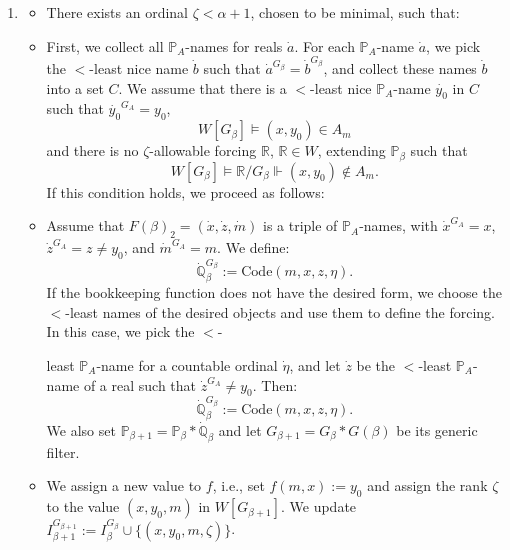 \documentclass[a4paper,11pt]{article}
\newcommand{\forceP}{\mathbb{P}}
\newcommand{\forceQ}{\mathbb{Q}}
\newcommand{\forceR}{\mathbb{R}}
\begin{document}
\begin{enumerate}
\item[(a)]  
  \begin{itemize}
  \item[] There exists an ordinal \( \zeta < \alpha+1 \), chosen to be minimal, such that:
  \item[] First, we collect all \( \forceP_A \)-names for reals \( \dot{a} \). For each \( \forceP_A \)-name \( \dot{a} \), we pick the \( < \)-least nice name \( \dot{b} \) such that \( \dot{a}^{G_{\beta}} = \dot{b}^{G_{\beta}} \), and collect these names \( \dot{b} \) into a set \( C \). We assume that there is a \( < \)-least nice \( \forceP_A \)-name \( \dot{y_0} \) in \( C \) such that \( \dot{y_0}^{G_A} = y_0 \), 
  \[
  W[G_{\beta}] \models (x, y_0) \in A_m
  \]
  and there is no \( \zeta \)-allowable forcing \( \forceR  \), \( \forceR \in W \), extending \( \forceP_{\beta} \) such that 
  \[
  W[G_{\beta}] \models \forceR / G_{\beta} \Vdash (x, y_0) \notin A_m.
  \]
  If this condition holds, we proceed as follows:
  \end{itemize}

  \begin{itemize}
  \item Assume that \( F(\beta)_2 = (\dot{x}, \dot{z}, \dot{m}) \) is a triple of \( \forceP_A \)-names, with \( \dot{x}^{G_A} = x \), \( \dot{z}^{G_A} = z \neq y_0 \), and \( \dot{m}^{G_A} = m \). We define:
  \[
  \dot{\forceQ}_{\beta}^{G_{\beta}} := \text{Code}(m,x,z,\eta).
  \]
  If the bookkeeping function does not have the desired form, we choose the \( < \)-least names of the desired objects and use them to define the forcing. In this case, we pick the \( < \)-

least \( \forceP_A \)-name for a countable ordinal \( \dot{\eta} \), and let \( \dot{z} \) be the \( < \)-least \( \forceP_A \)-name of a real such that \( \dot{z}^{G_A} \neq y_0 \). Then:
  \[
  \dot{\forceQ}_{\beta}^{G_{\beta}} := \text{Code}(m,x,z,\eta).
  \]
  We also set \( \forceP_{\beta+1} = \forceP_{\beta} \ast \dot{\forceQ}_{\beta} \) and let \( G_{\beta+1} = G_{\beta} \ast G(\beta) \) be its generic filter.

  \item We assign a new value to \( f \), i.e., set \( f(m, x) := y_0 \) and assign the rank \( \zeta \) to the value \( (x, y_0, m) \) in \( W[G_{\beta+1}] \). We update \( I_{\beta+1}^{G_{\beta+1}} := I_{\beta}^{G_{\beta}} \cup \{ (x, y_0,m, \zeta) \} \).
  \end{itemize}


\end{enumerate}
\end{document}
